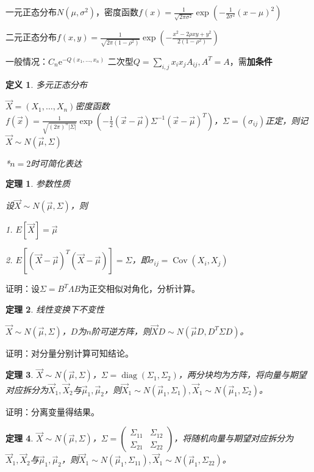 \documentclass[a4paper,UTF8,fontset=windows]{ctexart}
\newtheorem{thm}{定理}[section]
\newtheorem{defi}{定义}[section]
\DeclareMathOperator{\Cov}{Cov}
\DeclareMathOperator{\diag}{diag}
\begin{document}
一元正态分布$N(\mu,\sigma^2)$，密度函数$f(x)=\frac{1}{\sqrt{2\pi\sigma^2}}\exp\left(-\frac{1}{2\sigma^2}(x-\mu)^2\right)$

二元正态分布$f(x,y)=\frac{1}{\sqrt{2\pi(1-\rho^2)}}\exp\left(-\frac{x^2-2\rho xy+y^2}{2(1-\rho^2)}\right)$

一般情况：$C_n\mathrm{e}^{-Q(x_1,\dots,x_n)}$
二次型$Q=\sum_{i,j}x_ix_jA_{ij},A^T=A$，需\textbf{加条件}

\begin{defi} 多元正态分布
	
$\vec{X}=(X_1,\dots,X_n)$密度函数$f(\vec{x})=\frac{1}{\sqrt{(2\pi)^n|\Sigma|}}\exp(-\frac{1}{2}(\vec{x}-\vec{\mu})\Sigma^{-1}(\vec{x}-\vec{\mu})^T)$，$\Sigma=(\sigma_{ij})$正定，则记$\vec{X}\sim N(\vec{\mu},\Sigma)$

*$n=2$时可简化表达
\end{defi}

\begin{thm} 参数性质

设$\vec{X}\sim N(\vec{\mu},\Sigma)$，则

1. $E[\vec{X}]=\vec{\mu}$

2. $E[(\vec{X}-\vec{\mu})^T(\vec{X}-\vec{\mu})]=\Sigma$，即$\sigma_{ij}=\Cov(X_i,X_j)$
\end{thm}

证明：设$\Sigma=B^T\Lambda B$为正交相似对角化，分析计算。

\begin{thm} 线性变换下不变性

$\vec{X}\sim N(\vec{\mu},\Sigma)$，$D$为$n$阶可逆方阵，则$\vec{X}D\sim N(\vec{\mu}D,D^T\Sigma D)$。
\end{thm}

证明：对分量分别计算可知结论。

\begin{thm}
$\vec{X}\sim N(\vec{\mu},\Sigma)$，$\Sigma=\diag(\Sigma_1,\Sigma_2)$，两分块均为方阵，将向量与期望对应拆分为$\vec{X}_1,\vec{X}_2$与$\vec{\mu}_1,\vec{\mu}_2$，则$\vec{X}_1\sim N(\vec{\mu}_1,\Sigma_1),\vec{X}_1\sim N(\vec{\mu}_1,\Sigma_2)$。
\end{thm}

证明：分离变量得结果。

\begin{thm}
$\vec{X}\sim N(\vec{\mu},\Sigma)$，$\Sigma=\begin{pmatrix}\Sigma_{11}&\Sigma_{12}\\\Sigma_{21}&\Sigma_{22}\end{pmatrix}$，将随机向量与期望对应拆分为$\vec{X}_1,\vec{X}_2$与$\vec{\mu}_1,\vec{\mu}_2$，则$\vec{X}_1\sim N(\vec{\mu}_1,\Sigma_{11}),\vec{X}_1\sim N(\vec{\mu}_1,\Sigma_{22})$。
\end{thm}
\end{document}
